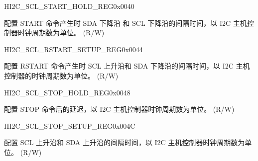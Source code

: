 \begin{register}{H}{I2C\_SCL\_START\_HOLD\_REG}{0x0040}\label{regdesc:I2CSCLSTARTHOLDREG}
%
%
\regnewline%
\begin{regdesc}\begin{reglist}
\label{fielddesc:I2CSCLSTARTHOLDTIME}\item [I2C\_SCL\_START\_HOLD\_TIME] 配置 START 命令产生时 SDA 下降沿 和 SCL 下降沿的间隔时间，以 I2C 主机控制器时钟周期数为单位。 (R/W)
\end{reglist}\end{regdesc}
\end{register}


\begin{register}{H}{I2C\_SCL\_RSTART\_SETUP\_REG}{0x0044}\label{regdesc:I2CSCLRSTARTSETUPREG}
%
%
\regnewline%
\begin{regdesc}\begin{reglist}
\label{fielddesc:I2CSCLRSTARTSETUPTIME}\item [I2C\_SCL\_RSTART\_SETUP\_TIME] 配置 RSTART 命令产生时 SCL 上升沿和 SDA 下降沿的间隔时间，以 I2C 主机控制器的时钟周期数为单位。 (R/W)
\end{reglist}\end{regdesc}
\end{register}


\begin{register}{H}{I2C\_SCL\_STOP\_HOLD\_REG}{0x0048}\label{regdesc:I2CSCLSTOPHOLDREG}
%
%
\regnewline%
\begin{regdesc}\begin{reglist}
\label{fielddesc:I2CSCLSTOPHOLDTIME}\item [I2C\_SCL\_STOP\_HOLD\_TIME] 配置 STOP 命令后的延迟，以 I2C 主机控制器时钟周期数为单位。 (R/W)
\end{reglist}\end{regdesc}
\end{register}


\begin{register}{H}{I2C\_SCL\_STOP\_SETUP\_REG}{0x004C}\label{regdesc:I2CSCLSTOPSETUPREG}
%
%
\regnewline%
\begin{regdesc}\begin{reglist}
\label{fielddesc:I2CSCLSTOPSETUPTIME}\item [I2C\_SCL\_STOP\_SETUP\_TIME] 配置 SCL 上升沿和 SDA 上升沿的间隔时间，以 I2C 主机控制器时钟周期数为单位。 (R/W)
\end{reglist}\end{regdesc}
\end{register}


